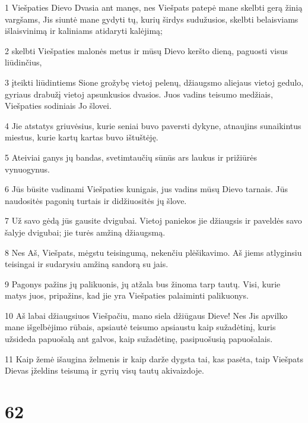 \par 1 Viešpaties Dievo Dvasia ant manęs, nes Viešpats patepė mane skelbti gerą žinią vargšams, Jis siuntė mane gydyti tų, kurių širdys sudužusios, skelbti belaisviams išlaisvinimą ir kaliniams atidaryti kalėjimą; 
\par 2 skelbti Viešpaties malonės metus ir mūsų Dievo keršto dieną, paguosti visus liūdinčius, 
\par 3 įteikti liūdintiems Sione grožybę vietoj pelenų, džiaugsmo aliejaus vietoj gedulo, gyriaus drabužį vietoj apsunkusios dvasios. Juos vadins teisumo medžiais, Viešpaties sodiniais Jo šlovei. 
\par 4 Jie atstatys griuvėsius, kurie seniai buvo paversti dykyne, atnaujins sunaikintus miestus, kurie kartų kartas buvo ištuštėję. 
\par 5 Ateiviai ganys jų bandas, svetimtaučių sūnūs ars laukus ir prižiūrės vynuogynus. 
\par 6 Jūs būsite vadinami Viešpaties kunigais, jus vadins mūsų Dievo tarnais. Jūs naudositės pagonių turtais ir didžiuositės jų šlove. 
\par 7 Už savo gėdą jūs gausite dvigubai. Vietoj paniekos jie džiaugsis ir paveldės savo šalyje dvigubai; jie turės amžiną džiaugsmą. 
\par 8 Nes Aš, Viešpats, mėgstu teisingumą, nekenčiu plėšikavimo. Aš jiems atlyginsiu teisingai ir sudarysiu amžiną sandorą su jais. 
\par 9 Pagonys pažins jų palikuonis, jų atžala bus žinoma tarp tautų. Visi, kurie matys juos, pripažins, kad jie yra Viešpaties palaiminti palikuonys. 
\par 10 Aš labai džiaugsiuos Viešpačiu, mano siela džiūgaus Dieve! Nes Jis apvilko mane išgelbėjimo rūbais, apsiautė teisumo apsiaustu kaip sužadėtinį, kuris užsideda papuošalą ant galvos, kaip sužadėtinę, pasipuošusią papuošalais. 
\par 11 Kaip žemė išaugina želmenis ir kaip darže dygsta tai, kas pasėta, taip Viešpats Dievas įželdins teisumą ir gyrių visų tautų akivaizdoje.



\chapter{62}


